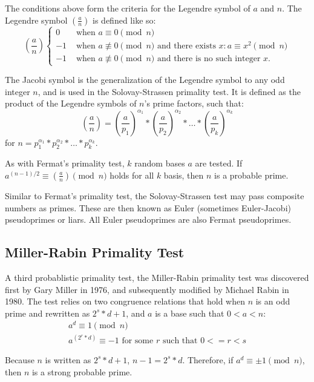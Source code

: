 \documentclass{article}
\begin{document}
The conditions above form the criteria for the Legendre symbol of $a$ and $n$. The Legendre symbol $(\frac{a}{n})$ is defined like so:
\[
    (\frac{a}{n}) \begin{cases}
        0 & \text{ when $a \equiv 0 \pmod{n}$} \\
        -1& \text{ when $a \not\equiv 0 \pmod{n}$ and there exists $x: a \equiv x^2 \pmod{n}$} \\
     -1& \text{ when $a \not\equiv 0 \pmod{n}$ and there is no such integer $x$.}
\end{cases}
\]

The Jacobi symbol is the generalization of the Legendre symbol to any odd integer $n$, and is used in the Solovay-Strassen primality test. It is defined as the product of the Legendre symbols of $n$'s prime factors, such that:
\[
    (\frac{a}{n}) = (\frac{a}{p_1})^{\alpha_{1}} * (\frac{a}{p_2})^{\alpha_{2}} * \ldots{} * (\frac{a}{p_k})^{\alpha_{k}}
\]
for $n = p_1^{\alpha_{1}} * p_2^{\alpha_{2}} * \ldots{} * p_k^{\alpha_{k}}$.

As with Fermat's primality test, $k$ random bases $a$ are tested. If $a^{(n - 1) / 2} \equiv (\frac{a}{n}) \pmod{n}$ holds for all $k$ basis, then $n$ is a probable prime.

Similar to Fermat's primality test, the Solovay-Strassen test may pass composite numbers as primes. These are then known as Euler (sometimes Euler-Jacobi) pseudoprimes or liars. All Euler pseudoprimes are also Fermat pseudoprimes. 

\subsection{Miller-Rabin Primality Test} %
A third probablistic primality test, the Miller-Rabin primality test was discovered first by Gary Miller in 1976, and subsequently modified by Michael Rabin in 1980. The test relies on two congruence relations that hold when $n$ is an odd prime and rewritten as $2^s * d + 1$, and $a$ is a base such that $0 < a < n$:
\begin{gather*}
    a^d \equiv 1 \pmod{n} \\
    a^{(2^r * d)} \equiv -1 \text{ for some $r$ such that $0 <= r < s$}
\end{gather*}

Because $n$ is written as $2^s * d + 1$, $n - 1 = 2^s * d$. Therefore, if $a^d \equiv \pm 1 \pmod{n}$, then $n$ is a strong probable prime.
\end{document}
